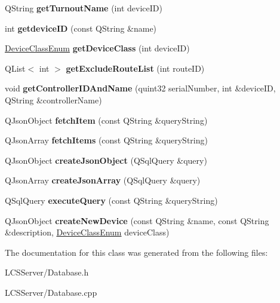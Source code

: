 \begin{DoxyCompactItemize}
Q\+String {\bfseries get\+Turnout\+Name} (int device\+ID)
\item 
\mbox{\label{class_database_aefd61c538939ce9b79c85c2df6914447}} 
int {\bfseries getdevice\+ID} (const Q\+String \&name)
\item 
\mbox{\label{class_database_aaa5f3cfe0c9dc902c3e8d688e8f954d7}} 
\hyperlink{_global_defs_8h_ad17679fac69973be9b3a2787a60d7722}{Device\+Class\+Enum} {\bfseries get\+Device\+Class} (int device\+ID)
\item 
\mbox{\label{class_database_a34aaa93240ff4b005b10e44ba1c6eaba}} 
Q\+List$<$ int $>$ {\bfseries get\+Exclude\+Route\+List} (int route\+ID)
\item 
\mbox{\label{class_database_a52a865e7e0e177dab5c0a451f37a1d1a}} 
void {\bfseries get\+Controller\+I\+D\+And\+Name} (quint32 serial\+Number, int \&device\+ID, Q\+String \&controller\+Name)
\item 
\mbox{\label{class_database_a1d17037c1dfaa2f67327ae0297d4567a}} 
Q\+Json\+Object {\bfseries fetch\+Item} (const Q\+String \&query\+String)
\item 
\mbox{\label{class_database_a1b1bd2990fdc80d0f4ed51f571966272}} 
Q\+Json\+Array {\bfseries fetch\+Items} (const Q\+String \&query\+String)
\item 
\mbox{\label{class_database_a82058cf13df09949bc4f6e28ce4931ba}} 
Q\+Json\+Object {\bfseries create\+Json\+Object} (Q\+Sql\+Query \&query)
\item 
\mbox{\label{class_database_a27d4e89a6c9e7bdd79a4548dcc0bafa7}} 
Q\+Json\+Array {\bfseries create\+Json\+Array} (Q\+Sql\+Query \&query)
\item 
\mbox{\label{class_database_a153d5c808b5da86954ef73b164ece2bf}} 
Q\+Sql\+Query {\bfseries execute\+Query} (const Q\+String \&query\+String)
\item 
\mbox{\label{class_database_a3f48c7b3de4006a858435788a588398a}} 
Q\+Json\+Object {\bfseries create\+New\+Device} (const Q\+String \&name, const Q\+String \&description, \hyperlink{_global_defs_8h_ad17679fac69973be9b3a2787a60d7722}{Device\+Class\+Enum} device\+Class)
\end{DoxyCompactItemize}


The documentation for this class was generated from the following files\+:\begin{DoxyCompactItemize}
\item 
L\+C\+S\+Server/Database.\+h\item 
L\+C\+S\+Server/Database.\+cpp\end{DoxyCompactItemize}
